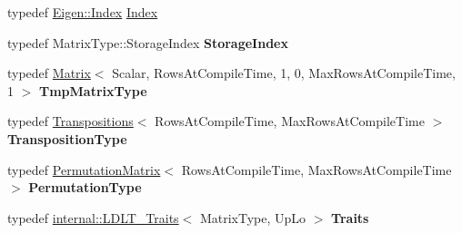 \begin{DoxyCompactItemize}
\item 
typedef \hyperlink{namespace_eigen_a62e77e0933482dafde8fe197d9a2cfde}{Eigen\+::\+Index} \hyperlink{group___cholesky___module_ad9c57eb2fb3bbccd51b9d2e111bea355}{Index}
\item 
\mbox{\label{group___cholesky___module_a8c2f233230eb0b517fd9dde624567bf2}} 
typedef Matrix\+Type\+::\+Storage\+Index {\bfseries Storage\+Index}
\item 
\mbox{\label{group___cholesky___module_aaf014c3e49793fadf342de6f96973166}} 
typedef \hyperlink{group___core___module_class_eigen_1_1_matrix}{Matrix}$<$ Scalar, Rows\+At\+Compile\+Time, 1, 0, Max\+Rows\+At\+Compile\+Time, 1 $>$ {\bfseries Tmp\+Matrix\+Type}
\item 
\mbox{\label{group___cholesky___module_ac3d686008cbd74d1d2721c936f7ff8b1}} 
typedef \hyperlink{group___core___module_class_eigen_1_1_transpositions}{Transpositions}$<$ Rows\+At\+Compile\+Time, Max\+Rows\+At\+Compile\+Time $>$ {\bfseries Transposition\+Type}
\item 
\mbox{\label{group___cholesky___module_a6a901ba1f333313e097ef3aac2164149}} 
typedef \hyperlink{group___core___module_class_eigen_1_1_permutation_matrix}{Permutation\+Matrix}$<$ Rows\+At\+Compile\+Time, Max\+Rows\+At\+Compile\+Time $>$ {\bfseries Permutation\+Type}
\item 
\mbox{\label{group___cholesky___module_a4755ce1400f755d7148cff2872e75d35}} 
typedef \hyperlink{struct_eigen_1_1internal_1_1_l_d_l_t___traits}{internal\+::\+L\+D\+L\+T\+\_\+\+Traits}$<$ Matrix\+Type, Up\+Lo $>$ {\bfseries Traits}
\end{DoxyCompactItemize}
